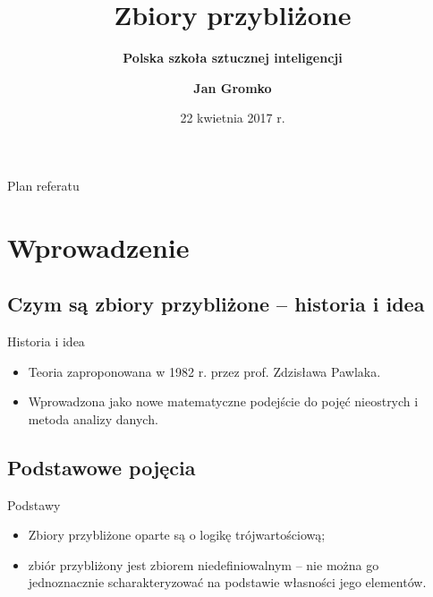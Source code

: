 \documentclass[10pt]{beamer}
\title[Polska szkoła sztucznej inteligencji – zbiory przybliżone] %
{ %
      \textbf{Zbiory przybliżone}
}
\subtitle[]
{
      \textbf{Polska szkoła sztucznej inteligencji}
}
\author[Jan Gromko]
{
\textbf{Jan Gromko}
}
\institute[SKN Math4You WI PB]
{
      Studenckie Koło Naukowe Math4You\\
      Wydział Informatyki Politechniki Białostockiej
}
\date{22 kwietnia 2017 r.}
\begin{document}
{\1%
\begin{frame}
  \titlepage
\end{frame}}


\begin{frame}{Plan referatu}{}
\tableofcontents
\end{frame}

\section{Wprowadzenie}
\subsection{Czym są zbiory przybliżone – historia i idea}
\begin{frame}{Historia i idea}
\begin{spacing}{1.5}
\begin{itemize}
\item Teoria zaproponowana w 1982 r. przez prof. Zdzisława Pawlaka.
\item Wprowadzona jako nowe matematyczne podejście do pojęć nieostrych i metoda analizy danych.
\end{itemize}
\end{spacing}

\end{frame}

\subsection{Podstawowe pojęcia}
\begin{frame}{Podstawy}
\begin{spacing}{1.5}
\begin{itemize}
\item Zbiory przybliżone oparte są o logikę trójwartościową;
\item zbiór przybliżony jest zbiorem niedefiniowalnym -- nie można go jednoznacznie scharakteryzować na podstawie własności jego elementów.
\end{itemize}

\end{spacing}
\end{frame}
\end{document}

